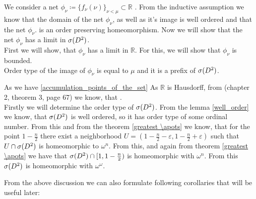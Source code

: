 We consider a net $\phi_\nu \coloneqq \{f_\nu(\nu)\}_{\nu<\mu} \subset \mathbb{R}$
. From the inductive assumption we know that the domain of the net $\phi_\nu$, as 
well as it's image is well ordered and that the net $\phi_\nu$.  
is an order preserving homeomorphism.
Now we will show that the net $\phi_\nu$ has a limit in ${{\sigma}(D^2)}$. \\
First we will show, that $\phi_\nu$ has a limit in $\mathbb{R}$. For this, we will show that 
$\phi_\nu$ is bounded. \\
Order type of the image of $\phi_\nu$ is equal to $\mu$ and it is a prefix of ${{\sigma}(D^2)}$. 

As we have \ref{accumulation_points_of_the_set} 
As $\mathbb{R}$ is Hausdorff, from \cite{Kelley1975} (chapter 2, 
theorem 3, page 67) we know, that .  
\\ 
Firstly we will determine the order type of ${{\sigma}(D^2)}$. 
From the lemma \ref{well_order} we know, that ${{\sigma}(D^2)}$ is well ordered, so it has order type 
of some ordinal number. From this and 
from the theorem \ref{greatest \apots} we know, that for the point $1-\frac{n}{2}$ there exist 
a neighborhood $U=(1-\frac{n}{2}-\varepsilon,1-\frac{n}{2}+\varepsilon)$ such that $U \cap 
{{\sigma}(D^2)}$ is homeomorphic to $\omega^n$. From this, and again from theorem \ref{greatest \apots} 
we have that ${{\sigma}(D^2)} \cap [1,1-\frac{n}{2})$ is homeomorphic with $\omega^n$. 
From this ${{\sigma}(D^2)}$ is homeomorphic with $\omega^\omega$.

From the above discussion we can also formulate following corollaries that will be useful later:

